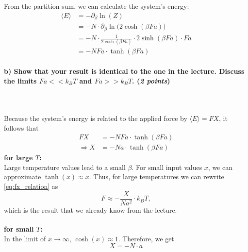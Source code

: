     \noindent
    From the partition sum, we can calculate the system's energy:
    \begin{align}
        \langle E\rangle
        &=-\partial_\beta \ln(Z) \\
        &=-N\cdot\partial_\beta\ln\bigg(2\cosh(\beta Fa)\bigg) \\
        &=-N\cdot\frac{1}{2\cosh(\beta Fa)}\cdot 2\sinh(\beta Fa)\cdot Fa \\
        &=-NFa\cdot\tanh(\beta Fa)
    \end{align}

\newpage
\paragraph{b) Show that your result is identical to the one in the lecture.
    Discuss the limits $Fa<<k_BT$ and $Fa>>k_BT$. (\textit{2 points})
} \ \\
    \\
    Because the system's energy is related to the applied force by 
    $\langle E\rangle=FX$, it follows that 
    \begin{align}
        FX
        &=-NFa\cdot\tanh(\beta Fa) \\
        \Rightarrow X
        &=-Na\cdot\tanh(\beta Fa)
        \label{eq:fx_relation}
    \end{align}
    \textbf{for large $T$:} \\
    Large temperature values lead to a small $\beta$.
    For small input values $x$, we can approximate $\tanh(x)\approx x$.
    Thus, for large temperatures we can rewrite \autoref{eq:fx_relation} as
    \begin{equation}
        F\approx-\frac{X}{Na^2}\cdot k_BT,
    \end{equation}
    which is the result that we already know from the lecture. \\
    \\
    \textbf{for small $T$:} \\
    In the limit of $x\to\infty$, $\cosh(x)\approx1$. Therefore, we get 
    \begin{equation}
        X=-N\cdot a
    \end{equation}

